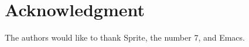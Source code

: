 \documentclass[conference]{IEEEtran}
\begin{document}
\section{Acknowledgment}

The authors would like to thank Sprite, the number 7, and Emacs.





\end{document}
